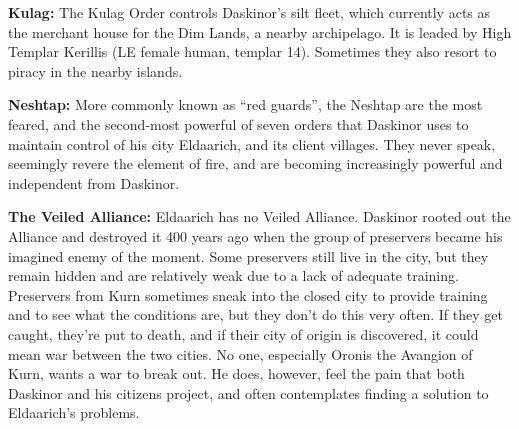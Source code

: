 {
	\textbf{Kulag:} The Kulag Order controls Daskinor's silt fleet, which currently acts as the merchant house for the Dim Lands, a nearby archipelago. It is leaded by High Templar Kerillis (LE female human, templar 14). Sometimes they also resort to piracy in the nearby islands.

	\textbf{Neshtap:} More commonly known as ``red guards'', the Neshtap are the most feared, and the second-most powerful of seven orders that Daskinor uses to maintain control of his city Eldaarich, and its client villages. They never speak, seemingly revere the element of fire, and are becoming increasingly powerful and independent from Daskinor.

	\textbf{The Veiled Alliance:} Eldaarich has no Veiled Alliance. Daskinor rooted out the Alliance and destroyed it 400 years ago when the group of preservers became his imagined enemy of the moment. Some preservers still live in the city, but they remain hidden and are relatively weak due to a lack of adequate training. Preservers from Kurn sometimes sneak into the closed city to provide training and to see what the conditions are, but they don't do this very often. If they get caught, they're put to death, and if their city of origin is discovered, it could mean war between the two cities. No one, especially Oronis the Avangion of Kurn, wants a war to break out. He does, however, feel the pain that both Daskinor and his citizens project, and often contemplates finding a solution to Eldaarich's problems.
}
{}{}
